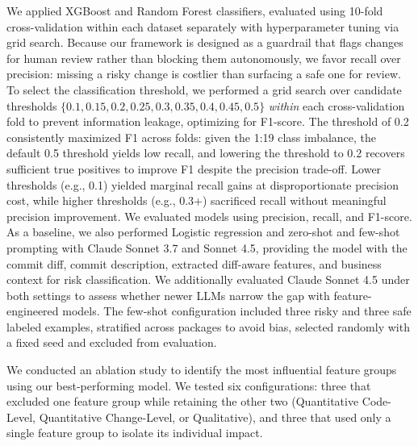 We applied XGBoost and Random Forest classifiers, evaluated using 10-fold cross-validation within each dataset separately with hyperparameter tuning via grid search. Because our framework is designed as a guardrail that flags changes for human review rather than blocking them autonomously, we favor recall over precision: missing a risky change is costlier than surfacing a safe one for review. To select the classification threshold, we performed a grid search over candidate thresholds $\{0.1, 0.15, 0.2, 0.25, 0.3, 0.35, 0.4, 0.45, 0.5\}$ \emph{within} each cross-validation fold to prevent information leakage, optimizing for F1-score. The threshold of 0.2 consistently maximized F1 across folds: given the 1:19 class imbalance, the default 0.5 threshold yields low recall, and lowering the threshold to 0.2 recovers sufficient true positives to improve F1 despite the precision trade-off. Lower thresholds (e.g., 0.1) yielded marginal recall gains at disproportionate precision cost, while higher thresholds (e.g., 0.3+) sacrificed recall without meaningful precision improvement. We evaluated models using precision, recall, and F1-score. As a baseline, we also performed Logistic regression and zero-shot and few-shot prompting with Claude Sonnet 3.7 and Sonnet 4.5, providing the model with the commit diff, commit description, extracted diff-aware features, and business context for risk classification. We additionally evaluated Claude Sonnet 4.5 under both settings to assess whether newer LLMs narrow the gap with feature-engineered models. The few-shot configuration included three risky and three safe labeled examples, stratified across packages to avoid bias, selected randomly with a fixed seed and excluded from evaluation.

We conducted an ablation study to identify the most influential feature groups using our best-performing model. We tested six configurations: three that excluded one feature group while retaining the other two (Quantitative Code-Level, Quantitative Change-Level, or Qualitative), and three that used only a single feature group to isolate its individual impact.
